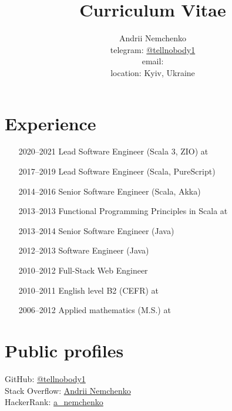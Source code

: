 

\title{Curriculum Vitae}
\author{
  Andrii Nemchenko\\
  telegram: \href{https://t.me/tellnobody1}{@tellnobody1}\\
  email: \\
  location: Kyiv, Ukraine
}
\maketitle

\section{Experience}
\begin{itemize}
  \item[2020–2021] Lead Software Engineer (Scala 3, ZIO) at 
  \item[2017–2019] Lead Software Engineer (Scala, PureScript)
  \item[2014–2016] Senior Software Engineer (Scala, Akka)
  \item[2013–2013] Functional Programming Principles in Scala at 
  \item[2013–2014] Senior Software Engineer (Java)
  \item[2012–2013] Software Engineer (Java)
  \item[2010–2012] Full-Stack Web Engineer
  \item[2010–2011] English level B2 (CEFR) at 
  \item[2006–2012] Applied mathematics (M.S.) at 
\end{itemize}

\section{Public profiles}
GitHub:
\href{https://github.com/tellnobody1}{@tellnobody1} \\
Stack Overflow:
\href{https://stackoverflow.com/users/355491}{Andrii Nemchenko} \\
HackerRank:
\href{https://www.hackerrank.com/a\_nemchenko}{a\_nemchenko}

\pagebreak


